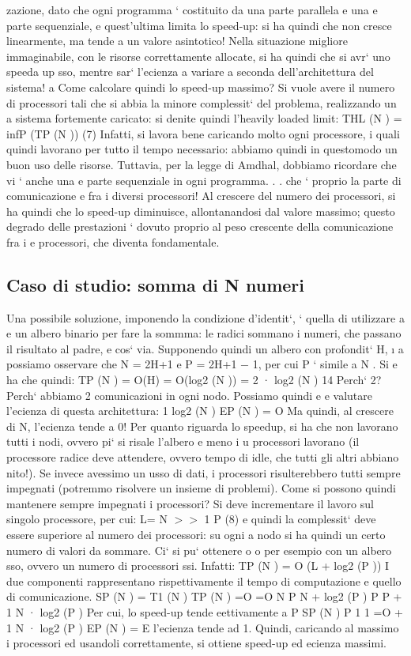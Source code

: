 \documentclass[a4paper,12pt]{article}
\begin{document}
zazione, dato che ogni programma ` costituito da una parte parallela e una
e
parte sequenziale, e quest'ultima limita lo speed-up: si ha quindi che non cresce
linearmente, ma tende a un valore asintotico! Nella situazione migliore immaginabile, con le risorse correttamente
allocate, si ha quindi che si avr` uno speeda
up sso, mentre sar` l'ecienza a variare a seconda dell'architettura del sistema!
a
Come calcolare quindi lo speed-up massimo? Si vuole avere il numero di
processori tali che si abbia la minore complessit` del problema, realizzando un
a
sistema fortemente caricato: si denite quindi l'heavily loaded limit:
THL (N ) = infP (TP (N ))
(7)
Infatti, si lavora bene caricando molto ogni processore, i quali quindi lavorano
per tutto il tempo necessario: abbiamo quindi in questomodo un buon uso delle
risorse.
Tuttavia, per la legge di Amdhal, dobbiamo ricordare che vi ` anche una
e
parte sequenziale in ogni programma. . . che ` proprio la parte di comunicazione
e
fra i diversi processori! Al crescere del numero dei processori, si ha quindi
che lo speed-up diminuisce, allontanandosi dal valore massimo; questo degrado
delle prestazioni ` dovuto proprio al peso crescente della comunicazione fra i
e
processori, che diventa fondamentale.
\subsection{Caso di studio: somma di N numeri}
Una possibile soluzione, imponendo la condizione d'identit`, ` quella di utilizzare
a e
un albero binario per fare la sommma: le radici sommano i numeri, che passano
il risultato al padre, e cos` via. Supponendo quindi un albero con profondit` H,
\i{}
a
possiamo osservare che N = 2H+1 e P = 2H+1 $-$ 1, per cui P ` simile a N . Si
e
ha che quindi:
TP (N ) = O(H)
= O(log2 (N ))
= 2 · log2 (N )
14
Perch` 2? Perch` abbiamo 2 comunicazioni in ogni nodo. Possiamo quindi
e
e
valutare l'ecienza di questa architettura:
1
log2 (N )
EP (N ) = O
Ma quindi, al crescere di N, l'ecienza tende a 0! Per quanto riguarda lo speedup, si ha che non lavorano tutti i nodi,
ovvero pi` si risale l'albero e meno i
u
processori lavorano (il processore radice deve attendere, ovvero tempo di idle,
che tutti gli altri abbiano nito!). Se invece avessimo un usso di dati, i processori risulterebbero tutti sempre
impegnati (potremmo risolvere un insieme di
problemi).
Come si possono quindi mantenere sempre impegnati i processori? Si deve
incrementare il lavoro sul singolo processore, per cui:
L=
N
$>$$>$ 1
P
(8)
e quindi la complessit` deve essere superiore al numero dei processori: su ogni
a
nodo si ha quindi un certo numero di valori da sommare. Ci` si pu` ottenere
o
o
per esempio con un albero sso, ovvero un numero di processori ssi. Infatti:
TP (N ) = O (L + log2 (P ))
I due componenti rappresentano rispettivamente il tempo di computazione e
quello di comunicazione.
SP (N ) =
T1 (N )
TP (N )
=O
=O
N
P
N
+ log2 (P )
P
P
+
1
N · log2 (P )
Per cui, lo speed-up tende eettivamente a P
SP (N )
P
1
1
=O
+
1 N · log2 (P )
EP (N ) =
E l'ecienza tende ad 1. Quindi, caricando al massimo i processori ed usandoli
correttamente, si ottiene speed-up ed ecienza massimi.
\end{document}
